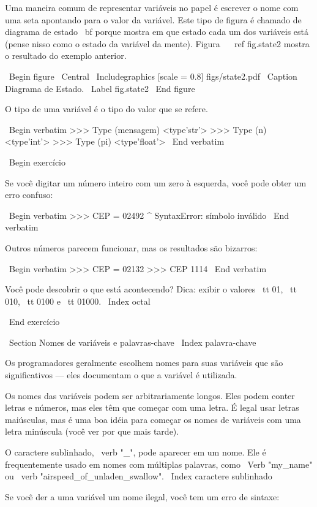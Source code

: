 \documentclass[10pt]{book}
\begin{document}
\begin {itemize}
{Uma maneira comum de representar variáveis ​​no papel é escrever o nome com
uma seta apontando para o valor da variável. Este tipo de figura é
chamado de diagrama de estado {\ bf} porque mostra em que estado cada um dos
variáveis ​​está (pense nisso como o estado da variável da mente).
Figura ~ \ ref {fig.state2} mostra o resultado do exemplo anterior.

\ Begin {figure}
\ Central
{\ Includegraphics [scale = 0.8] {figs/state2.pdf}}
\ Caption {Diagrama de Estado.}
\ Label {} fig.state2
\ End {figure}

O tipo de uma variável é o tipo do valor que se refere.

\ Begin {verbatim}
>>> Type (mensagem)
<type'str'>
>>> Type (n)
<type'int'>
>>> Type (pi)
<type'float'>
\ End {verbatim}

\ Begin {} exercício

Se você digitar um número inteiro com um zero à esquerda, você pode obter
um erro confuso:

\ Begin {verbatim}
>>> CEP = 02492
                  ^
SyntaxError: símbolo inválido
\ End {verbatim}

Outros números parecem funcionar, mas os resultados são bizarros:

\ Begin {verbatim}
>>> CEP = 02132
>>> CEP
1114
\ End {verbatim}

Você pode descobrir o que está acontecendo? Dica: exibir o
valores {\ tt 01}, {\ tt 010}, {\ tt 0100} e {\ tt 01000}.
\ Index {octal}

\ End {} exercício



\ Section {Nomes de variáveis ​​e palavras-chave}
\ Index {palavra-chave}

Os programadores geralmente escolhem nomes para suas variáveis ​​que
são significativos --- eles documentam o que a variável é utilizada.

Os nomes das variáveis ​​podem ser arbitrariamente longos. Eles podem conter
letras e números, mas eles têm que começar com uma letra.
É legal usar letras maiúsculas, mas é uma boa idéia
para começar os nomes de variáveis ​​com uma letra minúscula (você
ver por que mais tarde).

O caractere sublinhado, \ verb "_", pode aparecer em um nome.
Ele é frequentemente usado em nomes com múltiplas palavras, como
\ Verb "my_name" ou \ verb "airspeed_of_unladen_swallow".
\ Index {caractere sublinhado}

Se você der a uma variável um nome ilegal, você tem um erro de sintaxe:

}
\end{itemize}
\end{document}
